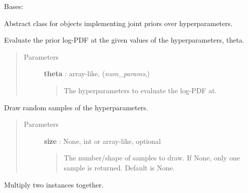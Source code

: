 \documentclass[letterpaper,10pt,english]{sphinxmanual}
\begin{document}
\begin{fulllineitems}
\label{gptools:gptools.utils.JointPrior}
Bases: 

Abstract class for objects implementing joint priors over hyperparameters.

\begin{fulllineitems}
\label{gptools:gptools.utils.JointPrior.__call__}
Evaluate the prior log-PDF at the given values of the hyperparameters, theta.
\begin{quote}\begin{description}
\item[{Parameters}] \leavevmode
\textbf{theta} : array-like, (\emph{num\_params},)
\begin{quote}

The hyperparameters to evaluate the log-PDF at.
\end{quote}

\end{description}\end{quote}

\end{fulllineitems}


\begin{fulllineitems}
\label{gptools:gptools.utils.JointPrior.random_draw}
Draw random samples of the hyperparameters.
\begin{quote}\begin{description}
\item[{Parameters}] \leavevmode
\textbf{size} : None, int or array-like, optional
\begin{quote}

The number/shape of samples to draw. If None, only one sample is
returned. Default is None.
\end{quote}

\end{description}\end{quote}

\end{fulllineitems}


\begin{fulllineitems}
\label{gptools:gptools.utils.JointPrior.__mul__}
Multiply two {\hyperref[gptools:gptools.utils.JointPrior]{}} instances together.

\end{fulllineitems}


\end{fulllineitems}
\end{document}
